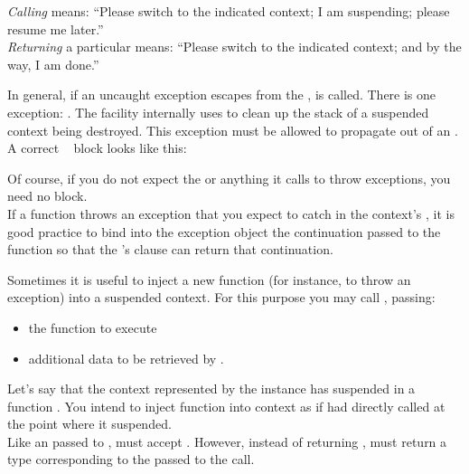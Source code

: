 \emph{Calling} \contresume means: ``Please switch to the indicated context; I
am suspending; please resume me later.''\\

\emph{Returning} a particular \cont means: ``Please switch to the indicated
context; and by the way, I am done.''


\label{subsec:exceptions}
In general, if an uncaught exception escapes from
the \entryfn,  is called. There is one
exception: \unwindex. The \callcc facility internally uses \unwindex to clean
up the stack of a suspended context being destroyed. This exception must be
allowed to propagate out of an \entryfn.\\

A correct \entryfn\  block looks like this:

Of course, if you do not expect the \entryfn or anything it calls to throw
exceptions, you need no  block.\\

If a \resumewith function throws an exception that you expect to catch in the
context's \entryfn, it is good practice to bind into the exception object the
continuation passed to the \resumewith function so that
the \entryfn's  clause can return that continuation.

\label{subsec:resumewith}
Sometimes it is useful to inject a new function (for instance, to throw an
exception) into a suspended context. For this purpose you may call
, passing:

\begin{itemize}
  \item the function  to execute
  \item additional data  to be retrieved by .
\end{itemize}

Let's say that the context represented by the \cont instance  has
suspended in a function . You intend to inject
function  into context  as if  had directly
called  at the point where it suspended.\\

Like an \entryfn passed to \callcc,  must
accept . However, instead of
returning \cont,  must return a type corresponding to the 
passed to the \resumewith call.


